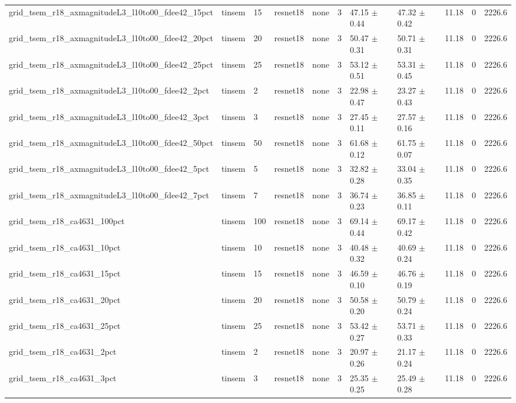 \begin{tabular}{lllllllllll}
grid_tsem_r18_axmagnitudeL3_l10to00_fdee42_15pct & tinsem & 15 & resnet18 & none & 3 & 47.15 $\pm$ 0.44 & 47.32 $\pm$ 0.42 & 11.18 & 0 & 2226.6 \\
grid_tsem_r18_axmagnitudeL3_l10to00_fdee42_20pct & tinsem & 20 & resnet18 & none & 3 & 50.47 $\pm$ 0.31 & 50.71 $\pm$ 0.31 & 11.18 & 0 & 2226.6 \\
grid_tsem_r18_axmagnitudeL3_l10to00_fdee42_25pct & tinsem & 25 & resnet18 & none & 3 & 53.12 $\pm$ 0.51 & 53.31 $\pm$ 0.45 & 11.18 & 0 & 2226.6 \\
grid_tsem_r18_axmagnitudeL3_l10to00_fdee42_2pct & tinsem & 2 & resnet18 & none & 3 & 22.98 $\pm$ 0.47 & 23.27 $\pm$ 0.43 & 11.18 & 0 & 2226.6 \\
grid_tsem_r18_axmagnitudeL3_l10to00_fdee42_3pct & tinsem & 3 & resnet18 & none & 3 & 27.45 $\pm$ 0.11 & 27.57 $\pm$ 0.16 & 11.18 & 0 & 2226.6 \\
grid_tsem_r18_axmagnitudeL3_l10to00_fdee42_50pct & tinsem & 50 & resnet18 & none & 3 & 61.68 $\pm$ 0.12 & 61.75 $\pm$ 0.07 & 11.18 & 0 & 2226.6 \\
grid_tsem_r18_axmagnitudeL3_l10to00_fdee42_5pct & tinsem & 5 & resnet18 & none & 3 & 32.82 $\pm$ 0.28 & 33.04 $\pm$ 0.35 & 11.18 & 0 & 2226.6 \\
grid_tsem_r18_axmagnitudeL3_l10to00_fdee42_7pct & tinsem & 7 & resnet18 & none & 3 & 36.74 $\pm$ 0.23 & 36.85 $\pm$ 0.11 & 11.18 & 0 & 2226.6 \\
grid_tsem_r18_ca4631_100pct & tinsem & 100 & resnet18 & none & 3 & 69.14 $\pm$ 0.44 & 69.17 $\pm$ 0.42 & 11.18 & 0 & 2226.6 \\
grid_tsem_r18_ca4631_10pct & tinsem & 10 & resnet18 & none & 3 & 40.48 $\pm$ 0.32 & 40.69 $\pm$ 0.24 & 11.18 & 0 & 2226.6 \\
grid_tsem_r18_ca4631_15pct & tinsem & 15 & resnet18 & none & 3 & 46.59 $\pm$ 0.10 & 46.76 $\pm$ 0.19 & 11.18 & 0 & 2226.6 \\
grid_tsem_r18_ca4631_20pct & tinsem & 20 & resnet18 & none & 3 & 50.58 $\pm$ 0.20 & 50.79 $\pm$ 0.24 & 11.18 & 0 & 2226.6 \\
grid_tsem_r18_ca4631_25pct & tinsem & 25 & resnet18 & none & 3 & 53.42 $\pm$ 0.27 & 53.71 $\pm$ 0.33 & 11.18 & 0 & 2226.6 \\
grid_tsem_r18_ca4631_2pct & tinsem & 2 & resnet18 & none & 3 & 20.97 $\pm$ 0.26 & 21.17 $\pm$ 0.24 & 11.18 & 0 & 2226.6 \\
grid_tsem_r18_ca4631_3pct & tinsem & 3 & resnet18 & none & 3 & 25.35 $\pm$ 0.25 & 25.49 $\pm$ 0.28 & 11.18 & 0 & 2226.6 \\

\end{tabular}
